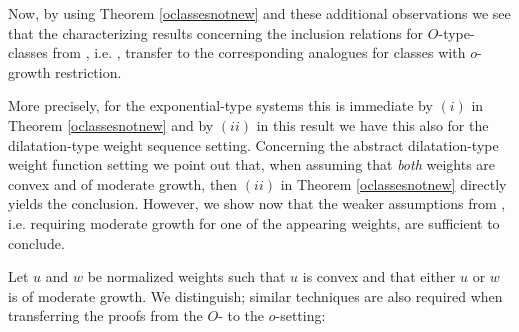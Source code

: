 \documentclass[10pt]{amsart}%
\numberwithin{equation}{section}
\theoremstyle{plain}
\begin{document}
Now, by using Theorem \ref{oclassesnotnew} and these additional observations we see that the characterizing results concerning the inclusion relations for $O$-type-classes from \cite[Sect. 3.2-3.5]{weightedentirecharacterization}, i.e. \cite[Thm. 3.15, 3.20, 3.25 \& 3.28]{weightedentirecharacterization}, transfer to the corresponding analogues for classes with $o$-growth restriction.\vspace{6pt}

More precisely, for the exponential-type systems this is immediate by $(i)$ in Theorem \ref{oclassesnotnew} and by $(ii)$ in this result we have this also for the dilatation-type weight sequence setting. Concerning the abstract dilatation-type weight function setting we point out that, when assuming that \emph{both} weights are convex and of moderate growth, then $(ii)$ in Theorem \ref{oclassesnotnew} directly yields the conclusion. However, we show now that the weaker assumptions from \cite[Thm. 3.25]{weightedentirecharacterization}, i.e. requiring moderate growth for one of the appearing weights, are sufficient to conclude.\vspace{6pt}

Let $u$ and $w$ be normalized weights such that $u$ is convex and that either $u$ or $w$ is of moderate growth. We distinguish; similar techniques are also required when transferring the proofs from the $O$- to the $o$-setting:
		
\end{document}
